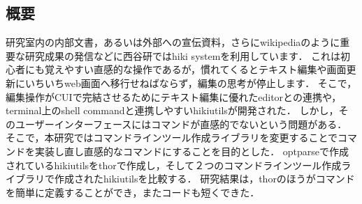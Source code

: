 \subsection{概要}
研究室内の内部文書，あるいは外部への宣伝資料，さらにwikipediaのように重要な研究成果の発信などに西谷研ではhiki systemを利用しています．
これは初心者にも覚えやすい直感的な操作であるが，慣れてくるとテキスト編集や画面更新にいちいちweb画面へ移行せねばならず，編集の思考が停止します．
そこで，編集操作がCUIで完結させるためにテキスト編集に優れたeditorとの連携や，terminal上のshell commandと連携しやすいhikiutilsが開発された．
しかし，そのユーザーインターフェースにはコマンドが直感的でないという問題がある．
そこで，本研究ではコマンドラインツール作成ライブラリを変更することでコマンドを実装し直し直感的なコマンドにすることを目的とした．
optparseで作成されているhikiutilsをthorで作成し，そして２つのコマンドラインツール作成ライブラリで作成されたhikiutilsを比較する．
研究結果は，thorのほうがコマンドを簡単に定義することができ，またコードも短くできた．

